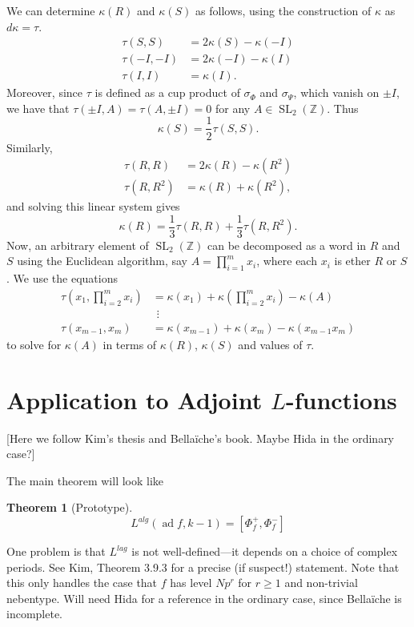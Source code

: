 \documentclass[10pt]{amsart}
\theoremstyle{plain}
\newtheorem{theorem}{Theorem}[section]
\theoremstyle{definition}
\newcommand{\ZZ}{{\mathbb{Z}}}
\DeclareMathOperator{\SL}{SL}
\DeclareMathOperator{\ad}{ad}
\begin{document}
We can determine $\kappa(R)$ and $\kappa(S)$ as follows, using the construction of $\kappa$ as $d\kappa = \tau$.
\begin{align*}
\tau(S,S) &= 2\kappa(S) - \kappa(-I) \\
\tau(-I,-I) &= 2\kappa(-I) - \kappa(I) \\
\tau(I,I) &= \kappa(I).
\end{align*}
Moreover, since $\tau$ is defined as a cup product of $\sigma_\Phi$ and $\sigma_\Psi$, which vanish on $\pm I$, we have that $\tau(\pm I, A) = \tau(A, \pm I) = 0$ for any $A \in \SL_2(\ZZ)$.  Thus
\begin{equation}
\kappa(S) = \frac12 \tau(S,S).
\end{equation}
Similarly,
\begin{align*}
\tau(R,R) &= 2\kappa(R) - \kappa(R^2) \\
\tau(R,R^2) &= \kappa(R) + \kappa(R^2),
\end{align*}
and solving this linear system gives
\begin{equation}
\kappa(R) = \frac13 \tau(R,R) + \frac13 \tau(R,R^2).
\end{equation}
Now, an arbitrary element of $\SL_2(\ZZ)$ can be decomposed as a word in $R$ and $S$ using the Euclidean algorithm, say $A = \prod_{i=1}^m x_i$, where each $x_i$ is ether $R$ or $S$.  We use the equations
\begin{align*}
\tau(x_1, \prod_{i=2}^m x_i) &= \kappa(x_1) + \kappa(\prod_{i=2}^m x_i) - \kappa(A) \\
&\hspace{5pt}\vdots \\
\tau(x_{m-1}, x_m) &= \kappa(x_{m-1}) + \kappa(x_m) - \kappa(x_{m-1}x_m)
\end{align*}
to solve for $\kappa(A)$ in terms of $\kappa(R)$, $\kappa(S)$ and values of $\tau$.

\section{Application to Adjoint $L$-functions} \label{sec:adjoint}

[Here we follow Kim's thesis and Bella\"iche's book. Maybe Hida in the ordinary case?]

The main theorem will look like
\begin{theorem}[Prototype]
\begin{equation}
	L^{alg}(\ad f , k-1) = [\Phi_{f}^+,\Phi_{f}^-]
\end{equation}
\end{theorem}
One problem is that $L^{lag}$ is not well-defined---it depends on a choice of complex periods. See Kim, Theorem 3.9.3 for a precise (if suspect!) statement. Note that this only handles the case that $f$ has level $Np^r$ for $r\geq 1$ and non-trivial nebentype. Will need Hida for a reference in the ordinary case, since Bella\"iche is incomplete.
\end{document}
